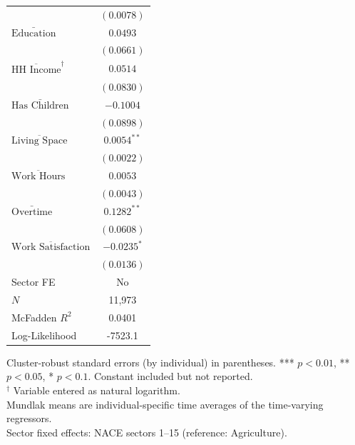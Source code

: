 \begin{table}[htbp]
\begin{tabular}{lc}
    \multicolumn{1}{l}{} & $(0.0078)$ \\[2pt]
    $\bar{\text{Education}}$ & $0.0493$ \\
    \multicolumn{1}{l}{} & $(0.0661)$ \\[2pt]
    $\overline{\text{HH Income}}^\dagger$ & $0.0514$ \\
    \multicolumn{1}{l}{} & $(0.0830)$ \\[2pt]
    $\bar{\text{Has Children}}$ & $-0.1004$ \\
    \multicolumn{1}{l}{} & $(0.0898)$ \\[2pt]
    $\overline{\text{Living Space}}$ & $0.0054^{**}$ \\
    \multicolumn{1}{l}{} & $(0.0022)$ \\[2pt]
    $\overline{\text{Work Hours}}$ & $0.0053$ \\
    \multicolumn{1}{l}{} & $(0.0043)$ \\[2pt]
    $\bar{\text{Overtime}}$ & $0.1282^{**}$ \\
    \multicolumn{1}{l}{} & $(0.0608)$ \\[2pt]
    $\overline{\text{Work Satisfaction}}$ & $-0.0235^{*}$ \\
    \multicolumn{1}{l}{} & $(0.0136)$ \\[2pt]
  \midrule
  Sector FE & No \\
  \midrule
  $N$ & 11,973 \\
  McFadden $R^2$ & 0.0401 \\
  Log-Likelihood & -7523.1 \\
  \bottomrule
\end{tabular}
\smallskip
\parbox{\linewidth}{
\footnotesize Cluster-robust standard errors (by individual) in parentheses. *** $p<0.01$, ** $p<0.05$, * $p<0.1$. Constant included but not reported. \\
\footnotesize $^\dagger$ Variable entered as natural logarithm. \\
\footnotesize Mundlak means are individual-specific time averages of the time-varying regressors. \\
\footnotesize Sector fixed effects: NACE sectors 1--15 (reference: Agriculture).
}
\end{table}
